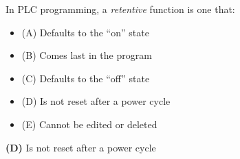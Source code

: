

In PLC programming, a {\it retentive} function is one that:

\begin{itemize}
\item{(A)} Defaults to the ``on'' state
\vskip 5pt 
\item{(B)} Comes last in the program
\vskip 5pt 
\item{(C)} Defaults to the ``off'' state
\vskip 5pt 
\item{(D)} Is not reset after a power cycle
\vskip 5pt 
\item{(E)} Cannot be edited or deleted
\end{itemize}







{\bf (D)} Is not reset after a power cycle
 










